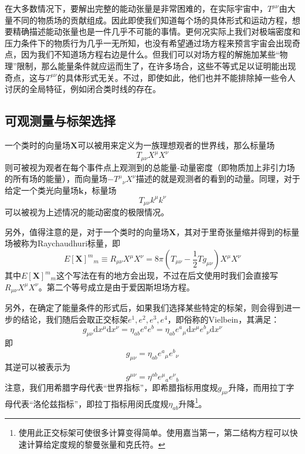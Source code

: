\documentclass[hyperref, UTF8, a4paper]{ctexart}
\begin{document}
在大多数情况下，要解出完整的能动张量是非常困难的，在实际宇宙中，$T^{\mu \nu }$由大量不同的物质场的贡献组成。因此即使我们知道每个场的具体形式和运动方程，想要精确描述能动张量也是一件几乎不可能的事情。更何况实际上我们对极端密度和压力条件下的物质行为几乎一无所知，也没有希望通过场方程来预言宇宙会出现奇点，因为我们不知道场方程右边是什么。但我们可以对场方程的解施加某些“物理”限制，那么能量条件就应运而生了，在许多场合，这些不等式足以证明能出现奇点，这与$T^{\mu \nu }$的具体形式无关。不过，即使如此，他们也并不能排除掉一些令人讨厌的全局特征，例如闭合类时线的存在。


\subsection{可观测量与标架选择}

一个类时的向量场$\boldsymbol{X}$可以被用来定义为一族理想观者的世界线，那么标量场
\begin{equation*}
	T_{\mu \nu } X^{\mu } X^{\nu }
\end{equation*}
则可被视为观者在每个事件点上观测到的总能量-动量密度（即物质加上非引力场的所有场的能量），而向量场$-T^{\mu }{}_{\nu } X^{\nu }$描述的就是观测者的看到的动量。同理，对于给定一个类光向量场$\boldsymbol{k}$，标量场
\begin{equation*}
	T_{\mu \nu } k^{\mu } k^{\nu }
\end{equation*}
可以被视为上述情况的能动密度的极限情况。

另外，值得注意的是，对于一个类时的向量场$\boldsymbol{X}$，其对于里奇张量缩并得到的标量场被称为Raychaudhuri标量，即
\begin{equation*}
	E[\boldsymbol{X}]^{m}{}_{m} \equiv R_{\mu \nu } X^{\mu } X^{\nu } =8\pi \left( T_{\mu \nu } -\frac{1}{2} Tg_{\mu \nu }\right) X^{\mu } X^{\nu }
\end{equation*}
其中$E[\boldsymbol{X}]^{m}{}_{m}$这个写法在有的地方会出现，不过在后文使用时我们会直接写$R_{\mu \nu } X^{\mu } X^{\nu }$。第二个等号成立是由于爱因斯坦场方程。

另外，在确定了能量条件的形式后，如果我们选择某些特定的标架，则会得到进一步的结论，我们随后会取正交标架$e^{1} ,e^{2} ,e^{3} ,e^{4}$，即俗称的Vielbein，其满足：
\begin{equation*}
	g_{\mu \nu }\mathrm{d} x^{\mu }\mathrm{d} x^{\nu } =\eta _{ab} e^{a} e^{b} =\eta _{ab} e^{a}{}_{\mu }\mathrm{d} x^{\mu } e^{b}{}_{\nu }\mathrm{d} x^{\nu }
\end{equation*}
即
\begin{equation*}
	g_{\mu \nu } =\eta _{ab} e^{a}{}_{\mu } e^{b}{}_{\nu }
\end{equation*}
其逆可以被表示为
\begin{equation*}
	g^{\mu \nu } =\eta ^{ab} e^{\mu }{}_{a} e^{\nu }{}_{b}
\end{equation*}
注意，我们用希腊字母代表“世界指标”，即希腊指标用度规$g_{\mu \nu }$升降，而用拉丁字母代表“洛伦兹指标”，即拉丁指标用闵氏度规$\eta _{ab}$升降\footnote{使用此正交标架可使很多计算变得简单。使用嘉当第一，第二结构方程可以快速计算给定度规的黎曼张量和克氏符。}。
\end{document}
